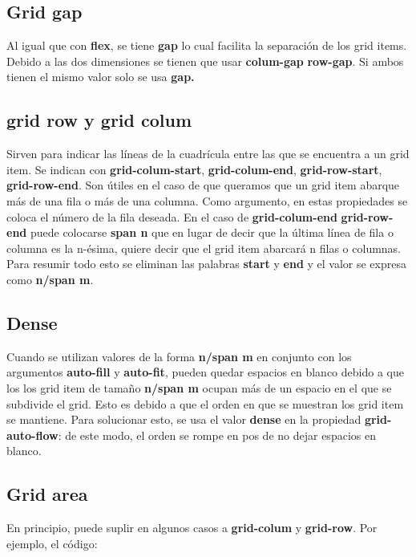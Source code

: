 \documentclass[10pt,oneside]{article}
\begin{document}
\begin{multicols}{2}
\subsection{Grid gap}

    Al igual que con \textbf{flex}, se tiene \textbf{gap} lo cual facilita la separación de los grid items. Debido a las dos dimensiones se tienen que usar \textbf{colum-gap} \textbf{row-gap}. Si ambos tienen el mismo valor solo se usa \textbf{gap.}

\subsection{grid row y grid colum}

     Sirven para indicar las líneas de la cuadrícula entre las que se encuentra a un grid item. Se indican con \textbf{grid-colum-start}, \textbf{grid-colum-end}, \textbf{grid-row-start}, \textbf{grid-row-end}. Son útiles en el caso de que queramos que un grid item abarque más de una fila o más de una columna. Como argumento, en estas propiedades se coloca el número de la fila deseada. En el caso de \textbf{grid-colum-end} \textbf{grid-row-end} puede colocarse \textbf{span n} que en lugar de decir que la última línea de fila o columna es la n-ésima, quiere decir que el grid item abarcará n filas o columnas. Para resumir todo esto se eliminan las palabras \textbf{start} y \textbf{end} y el valor se expresa como \textbf{n/span m}.

\subsection{Dense}

    Cuando se utilizan valores de la forma \textbf{n/span m} en conjunto con los argumentos \textbf{auto-fill} y \textbf{auto-fit}, pueden quedar espacios en blanco debido a que los los grid item  de tamaño \textbf{n/span m} ocupan más de un espacio en el que se subdivide el grid. Esto es debido a que el orden en que se muestran los grid item se mantiene. Para solucionar esto, se usa el valor \textbf{dense} en la propiedad \textbf{grid-auto-flow}: de este modo, el orden se rompe en pos de no dejar espacios en blanco. 

\subsection{Grid area}

   En principio, puede suplir en algunos casos a \textbf{grid-colum} y \textbf{grid-row}. Por ejemplo, el código:


\end{multicols}
\end{document}
